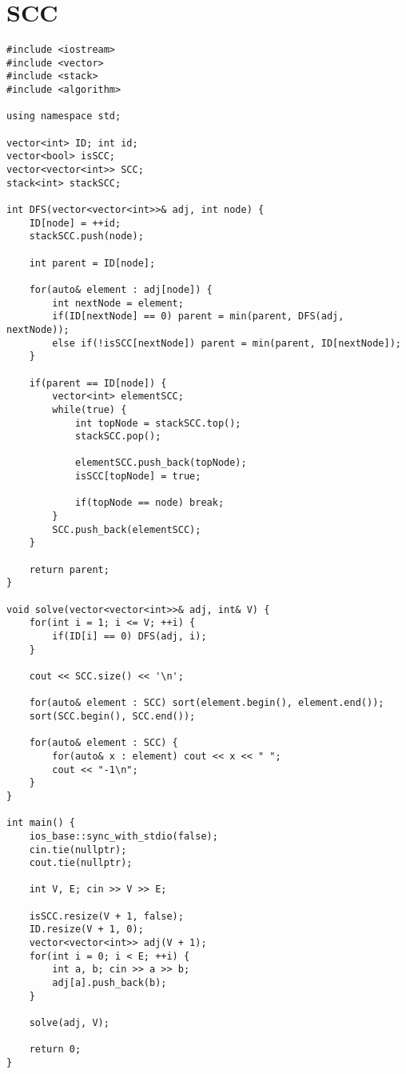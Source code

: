 \documentclass[landscape, 8pt, a4paper, oneside, twocolumn]{extarticle}
\begin{document}
\section{SCC}
\begin{verbatim}
#include <iostream>
#include <vector>
#include <stack>
#include <algorithm>

using namespace std;

vector<int> ID; int id;
vector<bool> isSCC;
vector<vector<int>> SCC;
stack<int> stackSCC;

int DFS(vector<vector<int>>& adj, int node) {
    ID[node] = ++id;
    stackSCC.push(node);

    int parent = ID[node];

    for(auto& element : adj[node]) {
        int nextNode = element;
        if(ID[nextNode] == 0) parent = min(parent, DFS(adj, nextNode));
        else if(!isSCC[nextNode]) parent = min(parent, ID[nextNode]);
    }

    if(parent == ID[node]) {
        vector<int> elementSCC;
        while(true) {
            int topNode = stackSCC.top();
            stackSCC.pop();

            elementSCC.push_back(topNode);
            isSCC[topNode] = true;

            if(topNode == node) break;
        }
        SCC.push_back(elementSCC);
    }

    return parent;
}

void solve(vector<vector<int>>& adj, int& V) {
    for(int i = 1; i <= V; ++i) {
        if(ID[i] == 0) DFS(adj, i);
    }

    cout << SCC.size() << '\n';
    
    for(auto& element : SCC) sort(element.begin(), element.end());
    sort(SCC.begin(), SCC.end());

    for(auto& element : SCC) {
        for(auto& x : element) cout << x << " ";
        cout << "-1\n";
    }
}

int main() {
    ios_base::sync_with_stdio(false);
    cin.tie(nullptr);
    cout.tie(nullptr);

    int V, E; cin >> V >> E;

    isSCC.resize(V + 1, false);
    ID.resize(V + 1, 0);
    vector<vector<int>> adj(V + 1);
    for(int i = 0; i < E; ++i) {
        int a, b; cin >> a >> b;
        adj[a].push_back(b);
    }

    solve(adj, V);

    return 0;
}
\end{verbatim}
\end{document}
